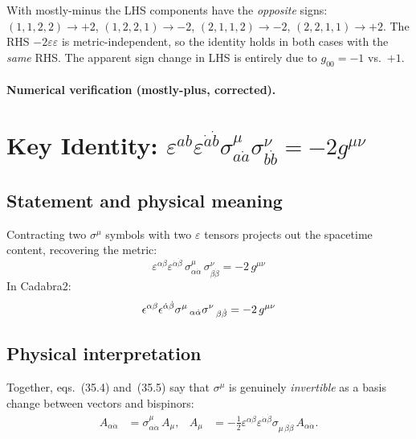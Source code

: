 \begin{metricnote}
With mostly-minus the LHS components have the \emph{opposite} signs:
$(1,1,2,2)\to+2$,\; $(1,2,2,1)\to-2$,\; $(2,1,1,2)\to-2$,\; $(2,2,1,1)\to+2$.
The RHS $-2\varepsilon\varepsilon$ is metric-independent, so the identity
holds in both cases with the \emph{same} RHS.
The apparent sign change in LHS is entirely due to $g_{00}=-1$ vs.\ $+1$.
\end{metricnote}

\paragraph{Numerical verification (mostly-plus, corrected).}

\section{Key Identity:
         \texorpdfstring{$\varepsilon^{ab}\varepsilon^{\dot{a}\dot{b}}
         \sigma^\mu_{a\dot{a}}\sigma^\nu_{b\dot{b}} = -2g^{\mu\nu}$}{eq 35.5}
         \quad [eq.~35.5]}

\subsection{Statement and physical meaning}

Contracting two $\sigma^\mu$ symbols with two $\varepsilon$ tensors
projects out the spacetime content, recovering the metric:
\begin{equation}
  \boxed{
    \varepsilon^{\alpha\beta}\varepsilon^{\dot\alpha\dot\beta}\,
    \sigma^\mu_{\alpha\dot\alpha}\,\sigma^\nu_{\beta\dot\beta}
    = -2\,g^{\mu\nu}
  }
  \tag{35.5}
\end{equation}
In Cadabra2:
\[
  \epsilon^{\alpha \beta} \epsilon^{\dot{\alpha} \dot{\beta}} \sigma^{\mu}\,_{\alpha \dot{\alpha}} \sigma^{\nu}\,_{\beta \dot{\beta}} = -2\,g^{\mu \nu}
\]

\subsection{Physical interpretation}

Together, eqs.~(35.4) and~(35.5) say that $\sigma^\mu$ is genuinely
\emph{invertible} as a basis change between vectors and bispinors:
\begin{align*}
  A_{\alpha\dot\alpha} &= \sigma^\mu_{\alpha\dot\alpha}\,A_\mu, &
  A_\mu &= -\tfrac{1}{2}\varepsilon^{\alpha\beta}\varepsilon^{\dot\alpha\dot\beta}
           \sigma_{\mu\,\beta\dot\beta}\,A_{\alpha\dot\alpha}.
\end{align*}

